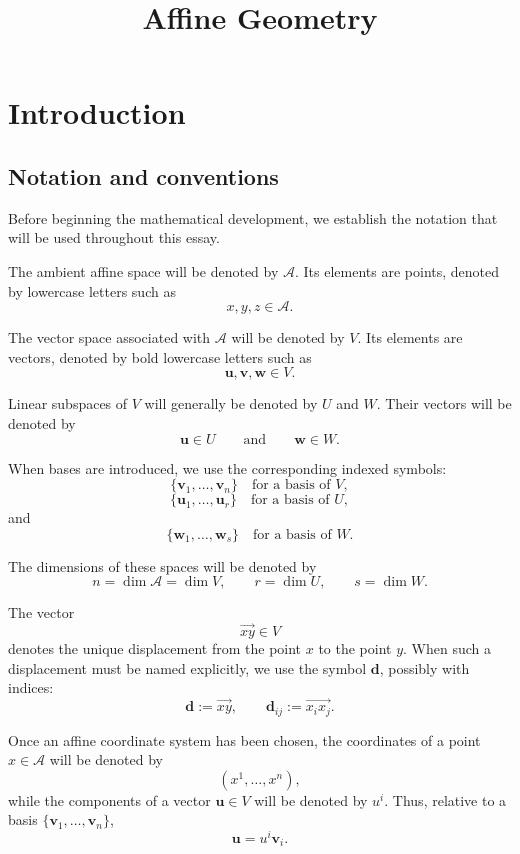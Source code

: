 \documentclass[12pt]{article}
\title{Affine Geometry}
\author{}
\date{}
\begin{document}
\maketitle

\section{Introduction}

\subsection{Notation and conventions}

Before beginning the mathematical development, we establish the notation
that will be used throughout this essay.

The ambient affine space will be denoted by \(\mathcal A\). Its elements
are points, denoted by lowercase letters such as
\[
x,y,z\in\mathcal A.
\]

The vector space associated with \(\mathcal A\) will be denoted by
\(V\). Its elements are vectors, denoted by bold lowercase letters such
as
\[
\mathbf u,\mathbf v,\mathbf w\in V.
\]

Linear subspaces of \(V\) will generally be denoted by \(U\) and \(W\).
Their vectors will be denoted by
\[
\mathbf u\in U
\qquad\text{and}\qquad
\mathbf w\in W.
\]

When bases are introduced, we use the corresponding indexed symbols:
\[
\{\mathbf v_1,\ldots,\mathbf v_n\}
    \quad\text{for a basis of }V,
\]
\[
\{\mathbf u_1,\ldots,\mathbf u_r\}
    \quad\text{for a basis of }U,
\]
and
\[
\{\mathbf w_1,\ldots,\mathbf w_s\}
    \quad\text{for a basis of }W.
\]

The dimensions of these spaces will be denoted by
\[
n=\dim\mathcal A=\dim V,
\qquad
r=\dim U,
\qquad
s=\dim W.
\]

The vector
\[
\overrightarrow{xy}\in V
\]
denotes the unique displacement from the point \(x\) to the point \(y\).
When such a displacement must be named explicitly, we use the symbol
\(\mathbf d\), possibly with indices:
\[
\mathbf d:=\overrightarrow{xy},
\qquad
\mathbf d_{ij}:=\overrightarrow{x_ix_j}.
\]

Once an affine coordinate system has been chosen, the coordinates of a
point \(x\in\mathcal A\) will be denoted by
\[
(x^1,\ldots,x^n),
\]
while the components of a vector \(\mathbf u\in V\) will be denoted by
\(u^i\). Thus, relative to a basis
\(\{\mathbf v_1,\ldots,\mathbf v_n\}\),
\[
\mathbf u=u^i\mathbf v_i.
\]
\end{document}
